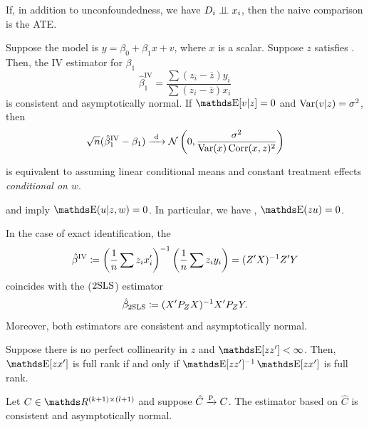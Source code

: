 \begin{proposition}
  If, in addition to unconfoundedness, we have \(D_i \perp \!\!\! \perp x_i\), then the naive comparison is the ATE.
\end{proposition}

\begin{proposition}
  Suppose the model is \(y = \beta_0 + \beta_1 x + v\), where \(x\) is a scalar.
  Suppose \(z\) satisfies .
  Then, the IV estimator for \(\beta_1\)
  \[
    \hat{\beta}_1^{\mathrm{IV}}
    = \frac{\sum (z_i - \overline{z}) y_i}{\sum (z_i - \overline{z}) x_i}
  \]
  is consistent and asymptotically normal.
  If \(\E[v|z] = 0\) and  \(\operatorname{Var}(v|z) = \sigma^2\), then
   \[
     \sqrt{n} (\hat{\beta}^{\operatorname{IV}}_1 - \beta_1)
     \xrightarrow{\ \mathrm{d}\ } \mathcal{N}\left( 0, \frac{\sigma^2}{\operatorname{Var}(x) \operatorname{Corr}(x, z)^2} \right) 
  \]
\end{proposition}

\begin{proposition}
   is equivalent to assuming linear conditional means and constant treatment effects \emph{conditional on \(w\)}.
\end{proposition}

\begin{proposition}
   and  imply \(\E(u|z, w) = 0\).
  In particular, we have , \(\E(zu) = 0\).
\end{proposition}

\begin{proposition}
  In the case of exact identification, the 
  \[
    \hat{\beta}^{\operatorname{IV}}
    \coloneqq \left( \frac{1}{n} \sum z_i x_i' \right)^{-1} \left( \frac{1}{n} \sum z_i y_i \right)
    = (Z'X)^{-1} Z'Y
  \]
  coincides with the  (\(\operatorname{2SLS}\)) estimator
  \[
    \hat{\beta}_{\operatorname{2SLS}}
    \coloneqq (X' P_Z X)^{-1} X' P_Z Y.
  \]
  Moreover, both estimators are consistent and asymptotically normal.
\end{proposition}

\begin{proposition}
  Suppose there is no perfect collinearity in \(z\) and \(\E[zz'] < \infty\).
  Then, \(\E[zx']\) is full rank if and only if \(\E[zz']^{-1} \E[zx']\) is full rank.
\end{proposition}

\begin{proposition}
  Let \(C \in \RR^{(k + 1) \times (l + 1)}\) and suppose \(\hat{C} \xrightarrow{\mathrm{p}} C\).
  The estimator based on \(\hat{C}\) is consistent and asymptotically normal.
\end{proposition}


